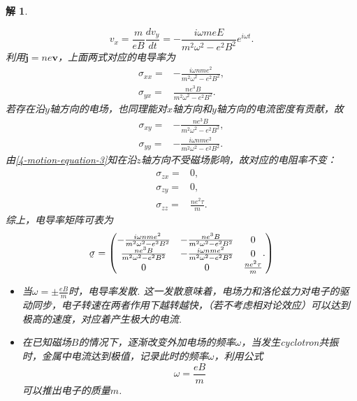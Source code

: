 \documentclass[UTF8,10pt,a4paper]{article}
\theoremstyle{Problem}
\theoremstyle{Solution}
\newtheorem*{sol}{解}
\begin{document}
\begin{sol}
\begin{enumerate}
\begin{equation}
            v_x=\frac{m}{eB}\frac{dv_y}{dt}=-\frac{i\omega meE}{m^2\omega^2-e^2B^2}e^{i\omega t}.
        \end{equation}
        利用$\bm{j}=ne\bm{v}$，上面两式对应的电导率为
        \begin{align}
            \sigma_{xx}=&-\frac{i\omega nme^2}{m^2\omega^2-e^2B^2},\\
            \sigma_{yx}=&\frac{ne^3B}{m^2\omega^2-e^2B^2}.
        \end{align}
        若存在沿$y$轴方向的电场，也同理能对$x$轴方向和$y$轴方向的电流密度有贡献，故
        \begin{align}
            \sigma_{xy}=&-\frac{ne^3B}{m^2\omega^2-e^2B^2},\\
            \sigma_{yy}=&-\frac{i\omega nme^2}{m^2\omega^2-e^2B^2}.
        \end{align}
        由\eqref{4-motion-equation-3}知在沿$z$轴方向不受磁场影响，故对应的电阻率不变：
        \begin{align}
            \sigma_{zx}=&0,\\
            \sigma_{zy}=&0,\\
            \sigma_{zz}=&\frac{ne^2\tau}{m}.
        \end{align}
        综上，电导率矩阵可表为
        \begin{equation}
            \underaccent{\tilde}{\sigma}=\left(\begin{matrix}
                -\frac{i\omega nme^2}{m^2\omega^2-e^2B^2}&-\frac{ne^3B}{m^2\omega^2-e^2B^2}&0\\
                \frac{ne^3B}{m^2\omega^2-e^2B^2}&-\frac{i\omega nme^2}{m^2\omega^2-e^2B^2}&0\\
                0&0&\frac{ne^2\tau}{m}
            \end{matrix}.\right)
        \end{equation}
        \begin{itemize}
            \item[$\triangleright$] 当$\omega=\pm\frac{eB}{m}$时，电导率发散. 这一发散意味着，电场力和洛伦兹力对电子的驱动同步，电子转速在两者作用下越转越快，（若不考虑相对论效应）可以达到极高的速度，对应着产生极大的电流.
            \item[$\triangleright$] 在已知磁场$B$的情况下，逐渐改变外加电场的频率$\omega$，当发生cyclotron共振时，金属中电流达到极值，记录此时的频率$\omega$，利用公式
            \begin{equation}
                \omega=\frac{eB}{m}
            \end{equation}
            可以推出电子的质量$m$.
        \end{itemize}
    \end{enumerate}
\end{sol}
\end{document}
